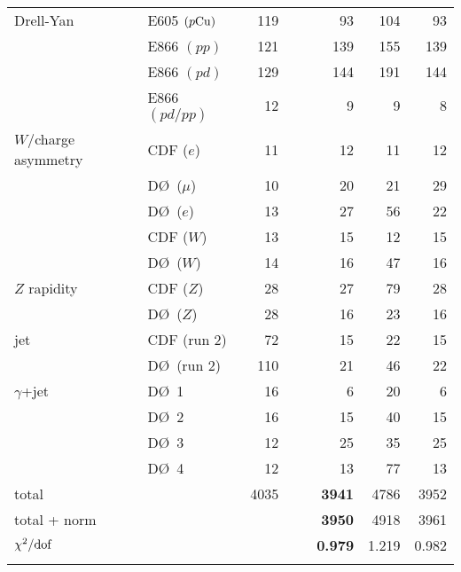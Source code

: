 \documentclass[aps,prd,amsmath,preprint]{revtex4}
\begin{document}
\begin{table}[t]
{\begin{tabular}[c]{llrrrr}
Drell-Yan
  & E605 $(p{\rm Cu})$	\cite{E605}     & 119 &  93 & 104 &  93 \\ %
  & E866 $(pp)$		\cite{E866}     & 121 & 139 & 155 & 139 \\
  & E866 $(pd)$ 	\cite{E866}     & 129 & 144 & 191 & 144 \\
  & E866 $(pd/pp)$ 	\cite{E866rat}  &  12 &   9 &   9 &   8 \\
$W/$charge asymmetry
  & CDF  ($e$)		\cite{CDF_e}    &  11 &  12 &  11 &  12 \\
  & D\O\ ($\mu$)  	\cite{D0_mu}    &  10 &  20 &  21 &  29 \\  
  & D\O\ ($e$) 		\cite{D0_e}     &  13 &  27 &  56 &  22 \\
  & CDF  ($W$)    	\cite{CDF_W}    &  13 &  15 &  12 &  15 \\
  & D\O\ ($W$)    	\cite{D0_W}     &  14 &  16 &  47 &  16 \\
$Z$ rapidity
  & CDF  ($Z$)		\cite{CDFZ}     &  28 &  27 &  79 &  28 \\ 
  & D\O\ ($Z$)		\cite{D0Z}      &  28 &  16 &  23 &  16 \\
jet
  & CDF  (run 2)       	\cite{CDFjet2}  &  72 &  15 &  22 &  15 \\
  & D\O\ (run 2)       	\cite{D0jet2}   & 110 &  21 &  46 &  22 \\
$\gamma$+jet
  & D\O\ 1           	\cite{D0gamjet} &  16 &   6 &  20 &   6 \\    
  & D\O\ 2           	\cite{D0gamjet} &  16 &  15 &  40 &  15 \\
  & D\O\ 3           	\cite{D0gamjet} &  12 &  25 &  35 &  25 \\
  & D\O\ 4           	\cite{D0gamjet} &  12 &  13 &  77 &  13 \\ \hline
%
total        		&		& 4035 &\ \ \ \ {\bf 3941} & 4786 & 3952 \\
total + norm 		&		&      &\ \ \ \ {\bf 3950} & 4918 & 3961 \\ \hline
$\chi^2/{\rm dof}$	&		&      & {\bf 0.979} & 1.219 & 0.982 \\  \hline\\
%
\end{tabular}
}
\label{tab:chi2}
\end{table}
\end{document}
